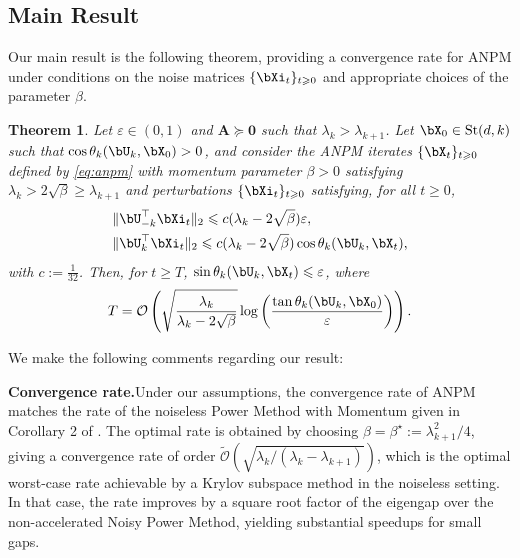\documentclass{article}
\theoremstyle{plain}
\newtheorem{theorem}{Theorem}[section]
\theoremstyle{definition}
\theoremstyle{remark}
\begin{document}
\subsection{Main Result} 

Our main result is the following theorem, providing a convergence rate for ANPM under conditions on the noise matrices $\{\bXi_t\}_{t\geqslant 0}$ and appropriate choices of the parameter $\beta$.

\begin{theorem}\label{th:napm}
    Let $\varepsilon \in (0,1)$ and $\mathbf{A} \succeq \mathbf{0}$ such that $\lambda_k > \lambda_{k+1}$. Let $\bX_0 \in \mathrm{St}(d,k)$ such that $\cos\theta_k(\bU_k, \bX_0) > 0$, and consider the ANPM iterates $\{\bX_t\}_{t\geqslant 0}$ defined by \eqref{eq:anpm} with momentum parameter $\beta > 0$ satisfying $\lambda_k > 2\sqrt{\beta} \geqslant \lambda_{k+1}$ and perturbations $\{\bXi_t\}_{t\geqslant 0}$ satisfying, for all $t\geqslant 0$,   
    \begin{align}
        & \Vert \bU_{-k}^\top\bXi_t \Vert_2 \leqslant c (\lambda_k - 2\sqrt{\beta})\varepsilon , \label{eq:noiseconda}\\
        & \Vert \bU_k^\top \bXi_t \Vert_2 \leqslant c (\lambda_k - 2\sqrt{\beta}) \cos\theta_k(\bU_k, \bX_t) \label{eq:noisecondb},
    \end{align}
    with $c:=\frac{1}{32}$. Then, for $t \geqslant T$, $\sin\theta_k(\bU_k, \bX_t) \leqslant \varepsilon$, where
    \begin{align*}
        T = \mathcal{O}\left(\sqrt{\frac{\lambda_k}{\lambda_k - 2\sqrt{\beta}}} \log\left(\frac{\tan\theta_k(\bU_k, \bX_0)}{\varepsilon}\right)\right).
    \end{align*} 
\end{theorem}


We make the following comments regarding our result:

\textbf{Convergence rate.}\quad Under our assumptions, the convergence rate of ANPM matches the rate of the noiseless Power Method with Momentum given in Corollary 2 of \citet{xu2018stochastic}. The optimal rate is obtained by choosing $\beta = \beta^\star := \lambda_{k+1}^2/4$, giving a convergence rate of order $\tilde{\mathcal{O}}(\sqrt{\lambda_k/(\lambda_k - \lambda_{k+1})})$, which is the optimal worst-case rate achievable by a Krylov subspace method in the noiseless setting. In that case, the rate improves by a square root factor of the eigengap over the non-accelerated Noisy Power Method, yielding substantial speedups for small gaps.
\end{document}
